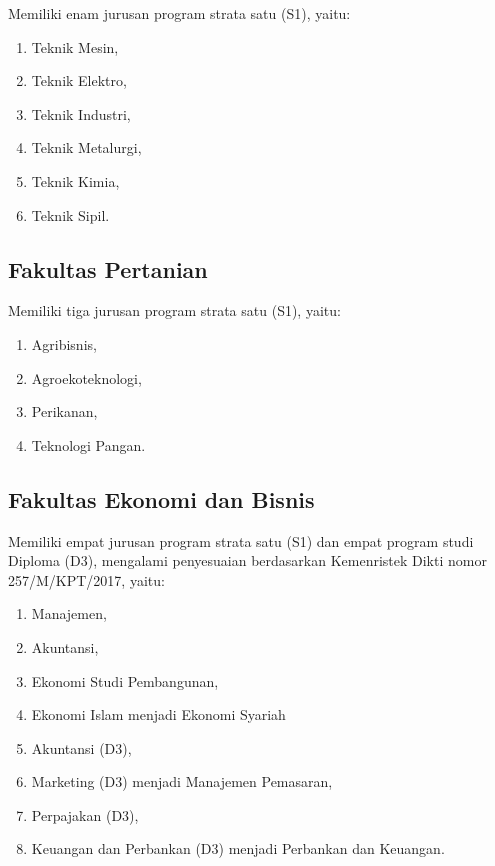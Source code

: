 \documentclass[
]{book}
\providecommand{\tightlist}{%
  \setlength{\itemsep}{0pt}\setlength{\parskip}{0pt}}
\begin{document}
Memiliki enam jurusan program strata satu (S1), yaitu:

\begin{enumerate}
\def\labelenumi{\arabic{enumi}.}
\tightlist
\item
  Teknik Mesin,\\
\item
  Teknik Elektro,\\
\item
  Teknik Industri,\\
\item
  Teknik Metalurgi,
\item
  Teknik Kimia,
\item
  Teknik Sipil.
\end{enumerate}

\hypertarget{fakultas-pertanian}{%
\subsection{Fakultas Pertanian}\label{fakultas-pertanian}}

Memiliki tiga jurusan program strata satu (S1), yaitu:

\begin{enumerate}
\def\labelenumi{\arabic{enumi}.}
\tightlist
\item
  Agribisnis,\\
\item
  Agroekoteknologi,\\
\item
  Perikanan,
\item
  Teknologi Pangan.
\end{enumerate}

\hypertarget{fakultas-ekonomi-dan-bisnis}{%
\subsection{Fakultas Ekonomi dan Bisnis}\label{fakultas-ekonomi-dan-bisnis}}

Memiliki empat jurusan program strata satu (S1) dan empat program studi Diploma (D3), mengalami penyesuaian berdasarkan Kemenristek Dikti nomor 257/M/KPT/2017, yaitu:

\begin{enumerate}
\def\labelenumi{\arabic{enumi}.}
\tightlist
\item
  Manajemen,
\item
  Akuntansi,
\item
  Ekonomi Studi Pembangunan,
\item
  Ekonomi Islam menjadi Ekonomi Syariah
\item
  Akuntansi (D3),\\
\item
  Marketing (D3) menjadi Manajemen Pemasaran,\\
\item
  Perpajakan (D3),
\item
  Keuangan dan Perbankan (D3) menjadi Perbankan dan Keuangan.
\end{enumerate}
\end{document}
